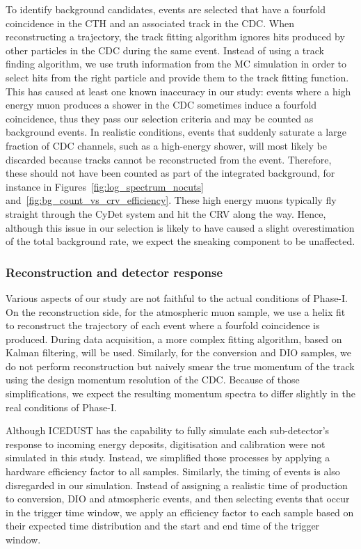 To identify background candidates, events are selected that have a fourfold
coincidence in the CTH and an associated track in the CDC. When reconstructing a
trajectory, the track fitting algorithm ignores hits produced by other particles
in the CDC during the same event. Instead of using a track finding algorithm, we
use truth information from the MC simulation in order to select hits from the
right particle and provide them to the track fitting function. This has caused
at least one known inaccuracy in our study: events where a high energy muon
produces a shower in the CDC sometimes induce a fourfold coincidence, thus they
pass our selection criteria and may be counted as background events. In
realistic conditions, events that suddenly saturate a large fraction of CDC
channels, such as a high-energy shower, will most likely be discarded because
tracks cannot be reconstructed from the event. Therefore, these should not have
been counted as part of the integrated background, for instance in
Figures~\ref{fig:log_spectrum_nocuts} and~\ref{fig:bg_count_vs_crv_efficiency}.
These high energy muons typically fly straight through the CyDet system and hit
the CRV along the way. Hence, although this issue in our selection is likely to
have caused a slight overestimation of the total background rate, we expect the
sneaking component to be unaffected.

\subsubsection{Reconstruction and detector response}
Various aspects of our study are not faithful to the actual conditions of
Phase\nobreakdash-I. On the reconstruction side, for the atmospheric muon sample, we use a
helix fit to reconstruct the trajectory of each event where a fourfold
coincidence is produced. During data acquisition, a more complex fitting
algorithm, based on Kalman filtering, will be used. Similarly, for the
conversion and DIO samples, we do not perform reconstruction but naively
smear the true momentum of the track using the design momentum resolution of the
CDC. Because of those simplifications, we expect the resulting momentum spectra
to differ slightly in the real conditions of Phase\nobreakdash-I. 

Although ICEDUST has the capability to fully simulate each sub-detector's
response to incoming energy deposits, digitisation and calibration were not
simulated in this study. Instead, we simplified those processes by applying a
hardware efficiency factor to all samples. Similarly, the timing of events is
also disregarded in our simulation. Instead of assigning a realistic time of
production to conversion, DIO and atmospheric events, and then selecting events
that occur in the trigger time window, we apply an efficiency factor to each
sample based on their expected time distribution and the start and end time of
the trigger window. 

